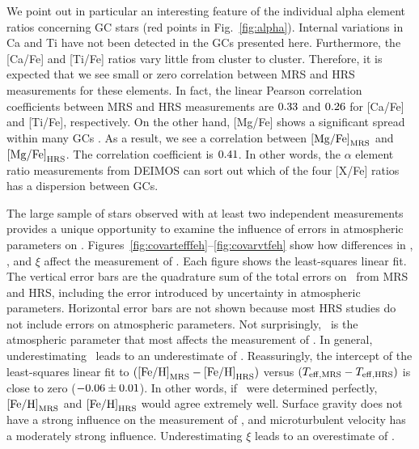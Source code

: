 \documentclass{emulateapj}
\begin{document}
We point out in particular an interesting feature of the individual
alpha element ratios concerning GC stars (red points in
Fig.~\ref{fig:alpha}).  Internal variations in Ca and Ti have not been
detected in the GCs presented here.  Furthermore, the [Ca/Fe] and
[Ti/Fe] ratios vary little from cluster to cluster.  Therefore, it is
expected that we see small or zero correlation between MRS and HRS
measurements for these elements.  In fact, the linear Pearson
correlation coefficients between MRS and HRS measurements are
$0.33$ and $0.26$ for [Ca/Fe] and [Ti/Fe],
respectively.  On the other hand, [Mg/Fe] shows a significant spread
within many GCs \citep[e.g.,][]{gra04}.  As a result, we see a
correlation between ${\rm [Mg/Fe]}_{\rm MRS}$ and ${\rm [Mg/Fe]}_{\rm
  HRS}$.  The correlation coefficient is $0.41$.  In other
words, the $\alpha$ element ratio measurements from DEIMOS can sort
out which of the four [X/Fe] ratios has a dispersion between GCs.

The large sample of stars observed with at least two independent
measurements provides a unique opportunity to examine the influence of
errors in atmospheric parameters on \feh.
Figures~\ref{fig:covartefffeh}--\ref{fig:covarvtfeh} show how
differences in \teff, \logg, and $\xi$ affect the measurement of \feh.
Each figure shows the least-squares linear fit.  The vertical error
bars are the quadrature sum of the total errors on \feh\ from MRS and
HRS, including the error introduced by uncertainty in atmospheric
parameters.  Horizontal error bars are not shown because most HRS
studies do not include errors on atmospheric parameters.  Not
surprisingly, \teff\ is the atmospheric parameter that most affects
the measurement of \feh.  In general, underestimating \teff\ leads to
an underestimate of \feh.  Reassuringly, the intercept of the
least-squares linear fit to $({\rm [Fe/H]}_{\rm MRS} - {\rm [Fe/H]}_{\rm
  HRS})$ versus $(T_{\rm eff,MRS} - T_{\rm eff,HRS})$ is close to zero
($-0.06 \pm 0.01$).  In other words, if \teff\ were
determined perfectly, ${\rm [Fe/H]}_{\rm MRS}$ and ${\rm [Fe/H]}_{\rm HRS}$
would agree extremely well.  Surface gravity does not have a strong
influence on the measurement of \feh, and microturbulent velocity has
a moderately strong influence.  Underestimating $\xi$ leads to an
overestimate of \feh.
\end{document}
